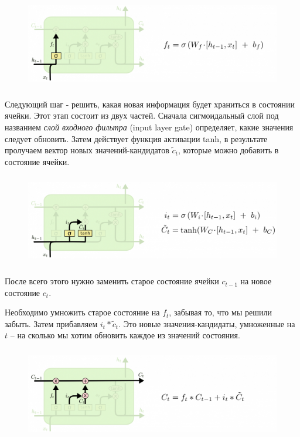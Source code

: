     \begin{figure}[ht!]
		\centering
		\captionsetup{justification=centering}
		\includegraphics[height=40mm]{img/LSTM_step1.png}
	\end{figure}
	
	Следующий шаг - решить, какая новая информация будет храниться в состоянии ячейки. Этот этап состоит из двух частей. Сначала сигмоидальный слой под названием \textit{слой входного фильтра} (input layer gate) определяет, какие значения следует обновить. Затем действует функция активации tanh, в результате пролучаем вектор новых значений-кандидатов $\tilde{c}_t$, которые можно добавить в состояние ячейки.
    
    \begin{figure}[ht!]
		\centering
		\captionsetup{justification=centering}
		\includegraphics[height=40mm]{img/LSTM_step2.png}
	\end{figure}
	
    После всего этого нужно заменить старое состояние ячейки $c_{t-1}$ на новое состояние $c_t$.
    
    Необходимо умножить старое состояние на $f_t$, забывая то, что мы решили забыть. Затем прибавляем $i_t*\tilde{c}_t$. Это новые значения-кандидаты, умноженные на $t$ – на сколько мы хотим обновить каждое из значений состояния.
    
    \begin{figure}[ht!]
		\centering
		\captionsetup{justification=centering}
		\includegraphics[height=40mm]{img/LSTM_step3.png}
	\end{figure}
	
